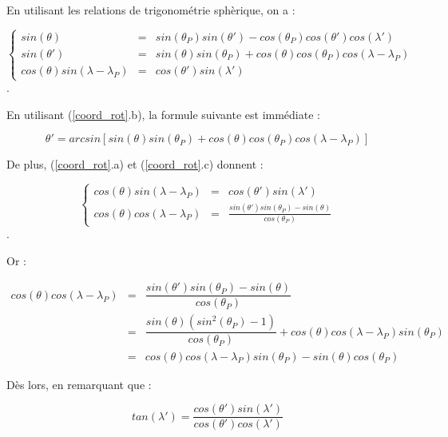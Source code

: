 En utilisant les relations de trigonométrie sphèrique, on a :

\begin{equation}
\label{coord_rot}
\left\lbrace 
\begin{array}{rcl}
sin ( \theta ) & = & sin( \theta_P) sin( \theta') - cos( \theta_P) cos( \theta') cos( \lambda' ) \\
sin( \theta' ) & = & sin( \theta) sin(\theta_P) + cos( \theta ) cos( \theta_P) cos( \lambda - \lambda_P ) \\
cos( \theta ) sin( \lambda - \lambda_P) & = & cos( \theta' ) sin( \lambda' )
\end{array}
\right.
\end{equation}.

En utilisant (\ref{coord_rot}.b), la formule suivante est immédiate :

\begin{equation}
\theta' = arcsin \left[ sin( \theta) sin(\theta_P) + cos( \theta ) cos( \theta_P) cos( \lambda - \lambda_P ) \right]
\end{equation}

De plus, (\ref{coord_rot}.a) et (\ref{coord_rot}.c) donnent :

\begin{equation}
\left\lbrace 
\begin{array}{rcl}
cos( \theta ) sin( \lambda - \lambda_P) & = & cos( \theta' ) sin( \lambda' ) \\
cos( \theta ) cos( \lambda - \lambda_P) & = & \frac{sin( \theta' ) sin ( \theta_P ) - sin( \theta )}{cos( \theta_P)}
\end{array}
\right.
\end{equation}.

Or :

\begin{equation*}
\begin{array}{rcl}
cos( \theta ) cos( \lambda - \lambda_P) & = & \dfrac{sin( \theta' ) sin ( \theta_P ) - sin( \theta )}{cos( \theta_P)} \\
 & = & \dfrac{sin( \theta) (sin^2 ( \theta_P) -1 )}{cos( \theta_P)} + cos( \theta ) cos( \lambda- \lambda_P) sin( \theta_P)\\
 & = & cos ( \theta) cos( \lambda - \lambda_P) sin( \theta_P ) - sin( \theta) cos ( \theta_P )
\end{array}
\end{equation*}

Dès lors, en remarquant que :

$$tan ( \lambda' ) =  \dfrac{cos( \theta' ) sin(  \lambda' ) }{cos( \theta' ) cos(  \lambda' )}$$

